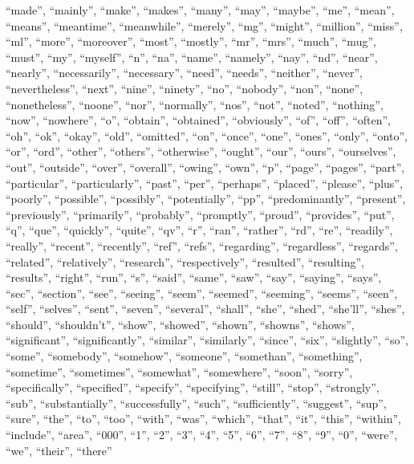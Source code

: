 \documentclass[midd]{thesis}
\begin{document}
``made'', ``mainly'', ``make'', ``makes'', ``many'', ``may'', ``maybe'', ``me'', ``mean'', ``means'', ``meantime'', ``meanwhile'', ``merely'', ``mg'', ``might'', ``million'', ``miss'', ``ml'', ``more'', ``moreover'', ``most'', ``mostly'', ``mr'', ``mrs'', ``much'', ``mug'', ``must'', ``my'', ``myself'', ``n'', ``na'', ``name'', ``namely'', ``nay'', ``nd'', ``near'', ``nearly'', ``necessarily'', ``necessary'', ``need'', ``needs'', ``neither'', ``never'', ``nevertheless'', ``next'', ``nine'', ``ninety'', ``no'', ``nobody'', ``non'', ``none'', ``nonetheless'', ``noone'', ``nor'', ``normally'', ``nos'', ``not'', ``noted'', ``nothing'', ``now'', ``nowhere'', ``o'', ``obtain'', ``obtained'', ``obviously'', ``of'', ``off'', ``often'', ``oh'', ``ok'', ``okay'', ``old'', ``omitted'', ``on'', ``once'', ``one'', ``ones'', ``only'', ``onto'', ``or'', ``ord'', ``other'', ``others'', ``otherwise'', ``ought'', ``our'', ``ours'', ``ourselves'', ``out'', ``outside'', ``over'', ``overall'', ``owing'', ``own'', ``p'', ``page'', ``pages'', ``part'', ``particular'', ``particularly'', ``past'', ``per'', ``perhaps'', ``placed'', ``please'', ``plus'', ``poorly'', ``possible'', ``possibly'', ``potentially'', ``pp'', ``predominantly'', ``present'', ``previously'', ``primarily'', ``probably'', ``promptly'', ``proud'', ``provides'', ``put'', ``q'', ``que'', ``quickly'', ``quite'', ``qv'', ``r'', ``ran'', ``rather'', ``rd'', ``re'', ``readily'', ``really'', ``recent'', ``recently'', ``ref'', ``refs'', ``regarding'', ``regardless'', ``regards'', ``related'', ``relatively'', ``research'', ``respectively'', ``resulted'', ``resulting'', ``results'', ``right'', ``run'', ``s'', ``said'', ``same'', ``saw'', ``say'', ``saying'', ``says'', ``sec'', ``section'', ``see'', ``seeing'', ``seem'', ``seemed'', ``seeming'', ``seems'', ``seen'', ``self'', ``selves'', ``sent'', ``seven'', ``several'', ``shall'', ``she'', ``shed'', ``she'll'', ``shes'', ``should'', ``shouldn't'', ``show'', ``showed'', ``shown'', ``showns'', ``shows'', ``significant'', ``significantly'', ``similar'', ``similarly'', ``since'', ``six'', ``slightly'', ``so'', ``some'', ``somebody'', ``somehow'', ``someone'', ``somethan'', ``something'', ``sometime'', ``sometimes'', ``somewhat'', ``somewhere'', ``soon'', ``sorry'', ``specifically'', ``specified'', ``specify'', ``specifying'', ``still'', ``stop'', ``strongly'', ``sub'', ``substantially'', ``successfully'', ``such'', ``sufficiently'', ``suggest'', ``sup'', ``sure'', ``the'', ``to'', ``too'', ``with'', ``was'', ``which'', ``that'', ``it'', ``this'', ``within'', ``include'', ``area'', ``000'', ``1'', ``2'', ``3'', ``4'', ``5'', ``6'', ``7'', ``8'', ``9'', ``0'', ``were'', ``we'', ``their'', ``there''
\nocite{*}


\end{document}
